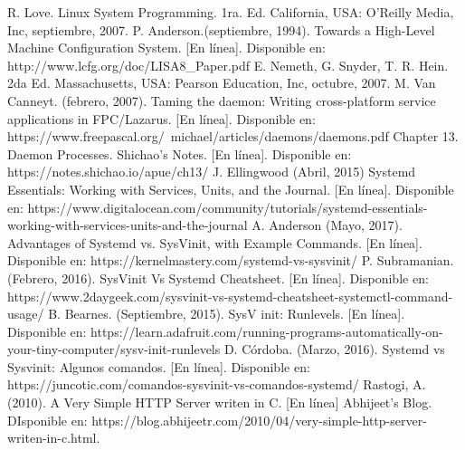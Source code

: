 \documentclass[conference]{IEEEtran}
\begin{document}
\begin{thebibliography}{1}
\bibitem{}
R. Love. Linux System Programming. 1ra. Ed. California, USA: O'Reilly Media, Inc, septiembre, 2007.
\bibitem{}
P. Anderson.(septiembre, 1994). Towards a High-Level Machine
Configuration System. [En línea]. Disponible en: http://www.lcfg.org/doc/LISA8\_Paper.pdf
\bibitem{}
E. Nemeth, G. Snyder, T. R. Hein. 2da Ed. Massachusetts, USA: Pearson Education, Inc, octubre, 2007.
\bibitem{}
M. Van Canneyt. (febrero, 2007). Taming the daemon: Writing cross-platform service applications in FPC/Lazarus. [En línea]. Disponible en: https://www.freepascal.org/~michael/articles/daemons/daemons.pdf
\bibitem{}
Chapter 13. Daemon Processes. Shichao’s Notes. [En línea]. Disponible en: https://notes.shichao.io/apue/ch13/
\bibitem{}
J. Ellingwood (Abril, 2015) Systemd Essentials: Working with Services, Units, and the Journal. [En línea]. Disponible en: https://www.digitalocean.com/community/tutorials/systemd-essentials-working-with-services-units-and-the-journal 
\bibitem{}
A. Anderson (Mayo, 2017). Advantages of Systemd vs. SysVinit, with Example Commands. [En línea]. Disponible en: https://kernelmastery.com/systemd-vs-sysvinit/
\bibitem{}
P. Subramanian. (Febrero, 2016). SysVinit Vs Systemd Cheatsheet. [En línea]. Disponible en: https://www.2daygeek.com/sysvinit-vs-systemd-cheatsheet-systemctl-command-usage/
\bibitem{}
B. Bearnes. (Septiembre, 2015). SysV init: Runlevels. [En línea]. Disponible en: https://learn.adafruit.com/running-programs-automatically-on-your-tiny-computer/sysv-init-runlevels
\bibitem{}
D. Córdoba. (Marzo, 2016). Systemd vs Sysvinit: Algunos comandos. [En línea]. Disponible en: https://juncotic.com/comandos-sysvinit-vs-comandos-systemd/
\bibitem{}
Rastogi, A. (2010). A Very Simple HTTP Server writen in C. [En línea] Abhijeet's Blog. DIsponible en: https://blog.abhijeetr.com/2010/04/very-simple-http-server-writen-in-c.html.
\end{thebibliography}
\end{document}
